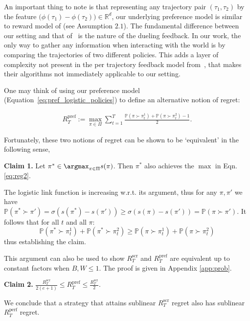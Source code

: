 \begin{rem}
An important thing to note is that representing any trajectory pair $(\tau_1,\tau_2)$ by the feature $\big(\phi(\tau_1)-\phi(\tau_2)\big) \in {\mathbb R}^d$, our underlying preference model is similar to reward model of \cite{chatterji21} (see Assumption $2.1$). The fundamental difference between our setting and that of~\cite{chatterji21} is the nature of the dueling feedback. In our work, the only way to gather any information when interacting with the world is by comparing the trajectories of two different policies. This adds a layer of complexity not present in the per trajectory feedback model from~\cite{chatterji21}, that makes their algorithms not immediately applicable to our setting. 
\end{rem}

One may think of using our preference model (Equation~\ref{eq:pref_logistic_policies}) to define an alternative notion of regret:

\begin{align}
\label{eq:reg2}
R_T^{\text{pref}} := \max_{\pi \in \Pi} \sum_{t = 1}^T \frac{\mathbb{P}(\pi \succ \pi_t^1) + \mathbb{P}(\pi \succ \pi_t^2) - 1}{2}.
\end{align}

Fortunately, these two notions of regret can be shown to be `equivalent' in the following sense,

 \textbf{Claim 1.} Let $\pi^* \in \argmax_{\pi \in \Pi}s(\pi)$. Then $\pi^*$ also achieves the $\max$ in Eqn. \ref{eq:reg2}.

The logistic link function is increasing w.r.t. its argument, thus for any $\pi, \pi'$ we have $\mathbb{P}(\pi^* \succ \pi' ) = \sigma(s(\pi^*) - s(\pi') )  \geq  \sigma(s(\pi) - s(\pi') ) =   \mathbb{P}(\pi \succ \pi ')$. It follows that for all $t$ and all $\pi$: 
$$\mathbb{P}(\pi^* \succ \pi_t^1 ) + \mathbb{P}(\pi^* \succ \pi_t^2 ) \geq \mathbb{P}(\pi \succ \pi_t^1 ) + \mathbb{P}(\pi \succ \pi_t^2 )  $$ thus establishing the claim.

This argument can also be used to show  $R_T^{\text{scr}}$ and $R_T^{\text{pref}}$ are equivalent up to constant factors when $B,W \leq 1$. The proof is given in Appendix \ref{app:prob}.

\textbf{Claim 2.} $\frac{R_T^{\text{scr}}}{2(e + 1)} \le R_T^{\text{pref}} \le \frac{R_T^{\text{scr}}}{2}$.

We conclude that a strategy that attains sublinear $R_T^{\text{scr}}$ regret also has sublinear $R_T^{\text{perf}}$ regret.

